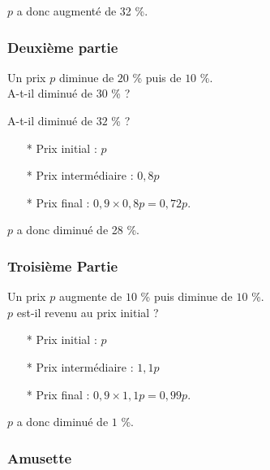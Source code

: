 \vspace{.3cm}

$p$ a donc augmenté de 32 \%.

\subsubsection*{Deuxième partie}

Un prix $p$ diminue de $20$ \% puis de $10$ \%. \\

A-t-il diminué de $30$ \% ? 

A-t-il diminué de $32$ \% ? \\

\begin{enumerate}
\item[*] Prix initial : $p$
\item[*] Prix intermédiaire : $0,8p$
\item[*] Prix final : $0,9 \times 0,8p = 0,72 p $. 
\end{enumerate} 

\vspace{.3cm}

$p$ a donc diminué de 28 \%.

\subsubsection*{Troisième Partie}

Un prix $p$ augmente de $10$ \% puis diminue de $10$ \%. \\

$p$ est-il revenu au prix initial ? \\

\begin{enumerate}
\item[*] Prix initial : $p$
\item[*] Prix intermédiaire : $1,1p$
\item[*] Prix final : $0,9 \times 1,1p = 0,99 p $. 
\end{enumerate} 

\vspace{.3cm}

$p$ a donc diminué de $1$ \%.

\newpage

\subsubsection*{Amusette}

